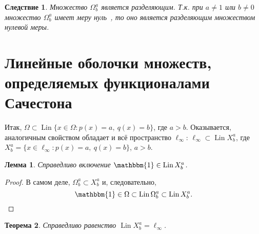 \documentclass[a4paper,14pt]{article} %
\theoremstyle{plain}
\newtheorem{lemma}{Лемма}[section]
\newtheorem{theorem}[lemma]{Теорема}
\newtheorem{corollary}{Следствие}[lemma]
\begin{document}
\begin{corollary}
	Множество $\Omega^a_b$ является разделяющим.
	Т.к. при $a\neq 1$ или $b\neq 0$ множество $\Omega^a_b$ имеет меру нуль~\cite{semenov2010characteristic},
	то оно является разделяющим множеством нулевой меры.
\end{corollary}



\section{Линейные оболочки множеств, определяемых функционалами Сачестона}

Итак, $\Omega \subset \operatorname{Lin}\{x\in\Omega : p(x) = a,~ q(x) = b\}$, где $a>b$.
Оказывается, аналогичным свойством обладает и всё пространство $\ell_\infty$:
$\ell_\infty\subset \operatorname{Lin} X^a_b$, где
$X^a_b = \{x\in\ell_\infty : p(x) = a,~ q(x) = b\}$, $a>b$.

\begin{lemma}
	\label{lem:const_Lin_ell_infty}
	Справедливо включение
	$\mathbbm{1}\in \operatorname{Lin} X^a_b$.
\end{lemma}

\begin{proof}
	В самом деле,
	$\Omega^a_b \subset X^a_b$
	и, следовательно,
	\begin{equation}
		\mathbbm{1} \in \Omega \subset \operatorname{Lin} \Omega^a_b \subset \operatorname{Lin} X^a_b
		.
	\end{equation}
\end{proof}

\begin{theorem}
	\label{thm:Lin_ell_infty}
	Справедливо равенство $\operatorname{Lin} X^a_b = \ell_\infty$.
\end{theorem}
\end{document}
